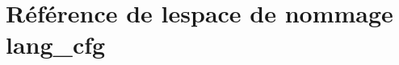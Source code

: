 \hypertarget{namespacelang__cfg}{}\section{Référence de l\textquotesingle{}espace de nommage lang\+\_\+cfg}
\label{namespacelang__cfg}
